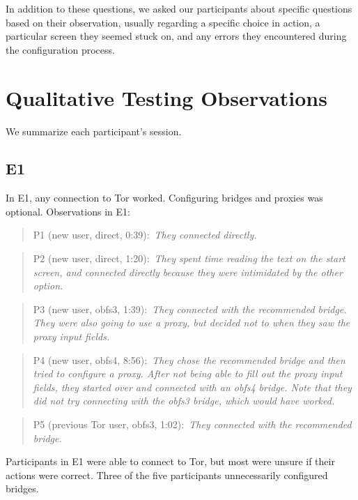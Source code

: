 \documentclass[USenglish,oneside,twocolumn]{article}
\newcommand{\pquote}[2]{
\begin{quotation}
\noindent #1:~\textit{#2}
\end{quotation}
}
\begin{document}
In addition to these questions, we asked our participants about specific questions based on their observation, usually regarding a specific choice in action, a particular screen they seemed stuck on, and any errors they encountered during the configuration process. 

\section{Qualitative Testing Observations}
\label{summary}
We summarize each participant's session.



\subsection{E1} 
In E1, any connection to Tor worked. Configuring bridges and proxies was optional.  
Observations in E1: 

\pquote{P1 (new user, direct, 0:39)}{They connected directly.}

\pquote{P2 (new user, direct, 1:20)}{They spent time reading the text on the start screen, and connected directly because they were intimidated by the other option.}

\pquote{P3 (new user, obfs3, 1:39)}{They connected with the recommended bridge. They were also going to use a proxy, but decided not to when they saw the proxy input fields.}

\pquote{P4 (new user, obfs4, 8:56)}{They chose the recommended bridge and then tried to configure a proxy. After not being able to fill out the proxy input fields, they started over and connected with an obfs4 bridge. Note that they did not try connecting with the obfs3 bridge, which would have worked.}

\pquote{P5 (previous Tor user, obfs3, 1:02)}{They connected with the recommended bridge.}

Participants in E1 were able to connect to Tor, but most were unsure if their actions were correct. Three of the five participants unnecessarily configured bridges. 
\end{document}
